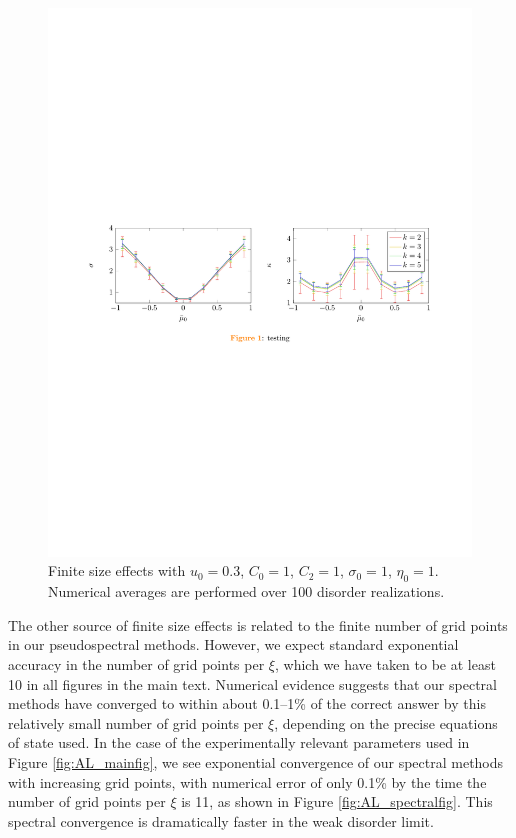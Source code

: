 \begin{figure}[t]
\centering
\includegraphics[width=7in]{figures/appendix/finitesizeplot1.pdf}
\caption{Finite size effects with $u_0=0.3$, $C_0=1$, $C_2=1$, $\sigma_0=1$, $\eta_0=1$.  Numerical averages are performed over 100 disorder realizations.}
\label{fig:AL_finitesizeplot}
\end{figure}


The other source of finite size effects is related to the finite number of grid points in our pseudospectral methods.   However, we expect standard exponential accuracy \cite{trefethen_spectral_2001} in the number of grid points per $\xi$, which we have taken to be at least 10 in all figures in the main text.   Numerical evidence suggests that our spectral methods have converged to within about 0.1--1\% of the correct answer by this relatively small number of grid points per $\xi$, depending on the precise equations of state used.  In the case of the experimentally relevant parameters used in Figure \ref{fig:AL_mainfig}, we see exponential convergence of our spectral methods with increasing grid points, with numerical error of only 0.1\% by the time the number of grid points per $\xi$ is 11, as shown in Figure \ref{fig:AL_spectralfig}.     This spectral convergence is dramatically faster in the weak disorder limit.

